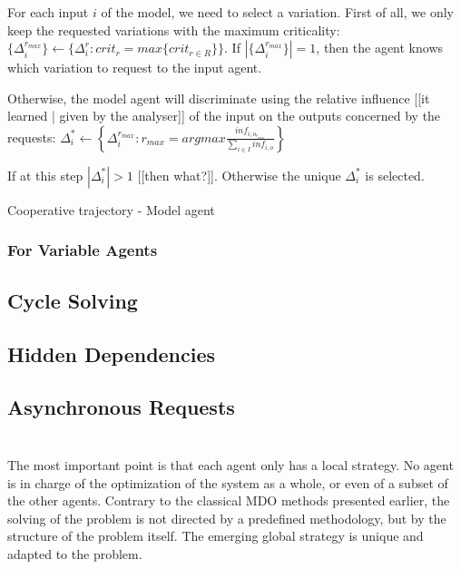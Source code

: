 For each input $i$ of the model, we need to select a variation.
First of all, we only keep the requested variations with the maximum criticality:  $\{\Delta_i^{r_{max}}\} \leftarrow \{\Delta_i^r : crit_r = max \{crit_{r \in R}\}\}$.
If $|\{\Delta_i^{r_{max}}\}| =  1$, then the agent knows which variation to request to the input agent.

Otherwise, the model agent will discriminate using the relative influence [[it learned | given by the analyser]] of the input on the outputs concerned by the requests: 
$\Delta_i^* \leftarrow \left\{ \Delta_i^{r_{max}} : r_{max} = argmax \frac{inf_{i,o_{r_{max}}}}{\sum \limits_{i \in I} inf_{i,o}} \right\}$

If at this step $|\Delta_i^*| >1$ [[then what?]]. Otherwise the unique $\Delta_i^*$ is selected.

\begin{algorithm}
\caption{Cooperative trajectory - Model agent}
\label{algo_cooperative_trajectory_model}
\begin{algorithmic}
\end{algorithmic}
\end{algorithm}

\subsubsection{For Variable Agents}

\subsection{Cycle Solving}

\subsection{Hidden Dependencies}

\subsection{Asynchronous Requests}

\section*{}
The most important point is that each agent only has a local strategy. No agent is in charge of the optimization of the system as a whole, or even of a subset of the other agents. Contrary to the classical MDO methods presented earlier, the solving of the problem is not directed by a predefined methodology, but by the structure of the problem itself. The emerging global strategy is unique and adapted to the problem.

